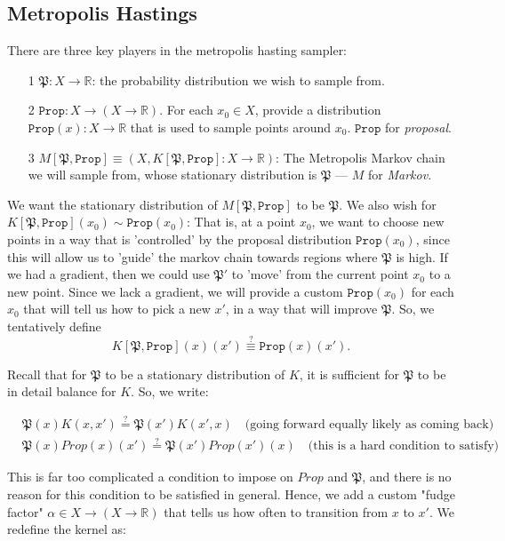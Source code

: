 \documentclass[titlepage]{article}
\newcommand{\R}{\mathbb{R}}
\renewcommand{\P}{\mathfrak{P}}
\newcommand{\Prop}{\texttt{Prop}}
\begin{document}
\subsection{Metropolis Hastings}

There are three key players in the metropolis hasting sampler:
\begin{itemize}
    \item [1] $\P: X \rightarrow \R$: the probability distribution we wish to sample from.
    \item[2] $\Prop: X \rightarrow (X \rightarrow \R)$. For each $x_0 \in X$,
        provide a distribution $\Prop(x): X \rightarrow \R$ that is used to
        sample points around $x_0$.  $\Prop$ for \emph{proposal}.
    \item [3] $M[\P, \Prop] \equiv (X, K[\P, \Prop]: X \rightarrow \R)$: The
        Metropolis Markov chain we will sample from, whose stationary distribution is $\P$ ---
        $M$ for \emph{Markov}.
\end{itemize}

We want the stationary distribution of $M[\P, \Prop]$ to be $\P$. We also
wish for $K[\P, \Prop](x_0) \sim \Prop(x_0)$: That is, at a point $x_0$, we want
to choose new points in a way that is 'controlled' by the proposal distribution
$\Prop(x_0)$, since this will allow us to 'guide' the markov chain towards regions where $\P$ is high.
If we had a gradient, then we could use $\P'$ to 'move' from the current point
$x_0$ to a new point. Since we lack a gradient, we will provide a custom
$\Prop(x_0)$ for each $x_0$ that will tell us how to pick a new $x'$, in
a way that will improve $\P$.  So, we tentatively define
$$K[\P, \Prop](x)(x') \stackrel{?}{\equiv} \Prop(x)(x').$$

Recall that for $\P$ to be a stationary distribution of $K$, it is sufficient
for $\P$ to be in detail balance for $K$. So, we write:

\begin{align*}
&\P(x) K(x, x') \stackrel{?}{=}  \P(x') K(x', x) \quad \text{(going forward equally likely as coming back)} \\
&\P(x) Prop(x)(x') \stackrel{?}{=} \P(x') Prop(x')(x) \quad \text{(this is a hard condition to satisfy)}
\end{align*}

This is far too complicated a condition to impose on $Prop$ and $\P$, and there
is no reason for this condition to be satisfied in general. Hence,
we add a custom "fudge factor" $\alpha \in X \rightarrow (X \rightarrow \R)$
that tells us how often to transition
from $x$ to $x'$. We redefine the kernel as:
\end{document}
